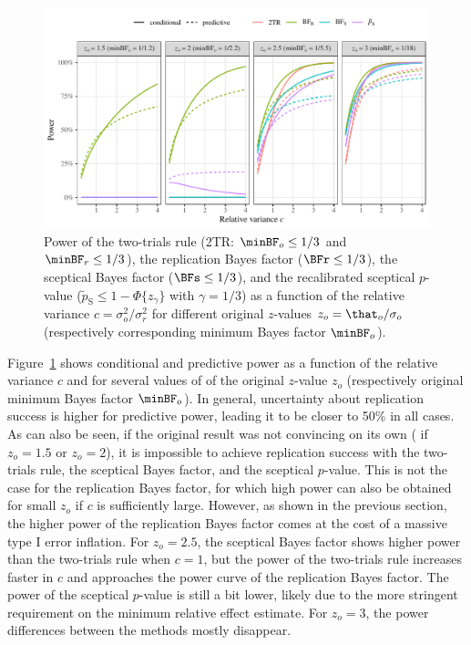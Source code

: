 \begin{figure}
\begin{knitrout}
\color{fgcolor}
\includegraphics[width=\maxwidth]{images/paper2/power-plots-1}
\end{knitrout}
\caption{Power of the two-trials rule (2TR: $\minBF_{o} \leq
1/3$ and $\minBF_{r} \leq
1/3$), the replication Bayes factor ($\BFr
\leq 1/3$), the sceptical Bayes factor ($\BFs
\leq
1/3$), and the recalibrated sceptical $p$-value ($\tilde{p}_{\mathrm{S}}
\leq 1 - \Phi\{z_{\gamma}\}$ with $\gamma =
1/3$) as a function of the relative variance $c
= \sigma^2_o/\sigma^2_r$ for different original $z$-values $z_o =
\that_o/\sigma_o$ (respectively corresponding minimum Bayes factor $\minBF_o$).}
\label{fig2:condpower}
\end{figure}

Figure~\ref{fig2:condpower} shows conditional and predictive power as a function
of the relative variance $c$ and for several values of of the original $z$-value
$z_o$ (respectively original minimum Bayes factor $\minBF_{o}$). In general,
uncertainty about replication success is higher for predictive power, leading it
to be closer to 50\% in all cases. As can also be seen, if the original result
was not convincing on its own (\eg{} if $z_o = 1.5$ or $z_{o} = 2$), it is
impossible to achieve replication success with the two-trials rule, the
sceptical Bayes factor, and the sceptical $p$-value. This is not the case for
the replication Bayes factor, for which high power can also be obtained for
small $z_o$ if $c$ is sufficiently large. However, as shown in the previous
section, the higher power of the replication Bayes factor comes at the cost of a
massive type I error inflation. For $z_o = 2.5$, the sceptical Bayes factor
shows higher power than the two-trials rule when $c = 1$, but the power of the
two-trials rule increases faster in $c$ and approaches the power curve of the
replication Bayes factor. The power of the sceptical $p$-value is still a bit
lower, likely due to the more stringent requirement on the minimum relative
effect estimate. For $z_{o} = 3$, the power differences between the methods
mostly disappear.

